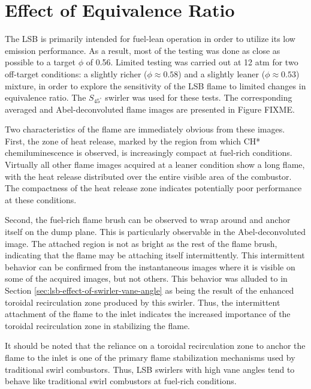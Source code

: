 \section{Effect of Equivalence Ratio}
\label{sec:lsb-effect-of-equivalence-ratio}

The LSB is primarily intended for fuel-lean operation in order to utilize its low  emission performance.
As a result, most of the testing was done as close as possible to a target \(\phi\) of 0.56.
Limited testing was carried out at 12 atm for two off-target conditions: a slightly richer (\(\phi \approx 0.58\)) and a slightly leaner (\(\phi \approx 0.53\)) mixture, in order to explore the sensitivity of the LSB flame to limited changes in equivalence ratio.
The \(S_{45^\circ}\) swirler was used for these tests.
The corresponding averaged and Abel-deconvoluted flame images are presented in Figure FIXME.

Two characteristics of the flame are immediately obvious from these images.
First, the zone of heat release, marked by the region from which CH* chemiluminescence is observed, is increasingly compact at fuel-rich conditions.
Virtually all other flame images acquired at a leaner condition show a long flame, with the heat release distributed over the entire visible area of the combustor.
The compactness of the heat release zone indicates potentially poor  performance at these conditions.

Second, the fuel-rich flame brush can be observed to wrap around and anchor itself on the dump plane.
This is particularly observable in the Abel-deconvoluted image.
The attached region is not as bright as the rest of the flame brush, indicating that the flame may be attaching itself intermittently.
This intermittent behavior can be confirmed from the instantaneous images where it is visible on some of the acquired images, but not others.
This behavior was alluded to in Section \ref{sec:lsb-effect-of-swirler-vane-angle} as being the result of the enhanced toroidal recirculation zone produced by this swirler.
Thus, the intermittent attachment of the flame to the inlet indicates the increased importance of the toroidal recirculation zone in stabilizing the flame.

It should be noted that the reliance on a toroidal recirculation zone to anchor the flame to the inlet is one of the primary flame stabilization mechanisms used by traditional swirl combustors.
Thus, LSB swirlers with high vane angles tend to behave like traditional swirl combustors at fuel-rich conditions.

